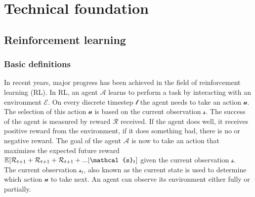 %
%

\chapter{Technical foundation}\label{chap.grundlagen}
\section{Reinforcement learning}\label{projektmanagement}
\subsection*{Basic definitions}\label{basic_rl_definitions}
In recent years, major progress has been achieved in the field of reinforcement learning (RL).
In RL, an agent $\mathcal{A}$ learns to perform a task by interacting with an environment $\mathcal{E}$. On every discrete timestep $\mathcal{t}$ the agent needs to take an action $\mathcal{u}$. The selection of this action $\mathcal{u}$ is based on the current observation $\mathcal{s}$. The success of the agent is measured by reward $\mathcal{R}$ received. If the agent does well, it receives positive reward from the environment, if it does something bad, there is no or negative reward. The goal of the agent $\mathcal{A}$ is now to take an action that maximizes the expected future reward  $\EX[\mathcal{R}_{t+1}+\mathcal{R}_{t+1}+\mathcal{R}_{t+1}+...|\mathcal{s}_{t}]$ given the current observation $\mathcal{s}$.\\
The current observation $\mathcal{s}_{t}$, also known as the current state is used to determine which action $\mathcal{u}$ to take next. An agent can observe its environment either fully or partially.
